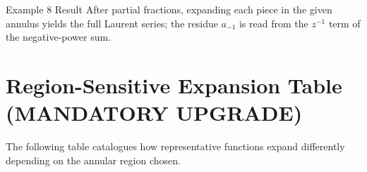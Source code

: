 \documentclass[12pt,a4paper]{article}
\begin{document}
\begin{learnbox}{Example 8 Result}
After partial fractions, expanding each piece in the given annulus yields the full Laurent series; the residue $a_{-1}$ is read from the $z^{-1}$ term of the negative-power sum.
\end{learnbox}

\section{Region-Sensitive Expansion Table (MANDATORY UPGRADE)}

The following table catalogues how representative functions expand differently depending on
the annular region chosen.
\end{document}
